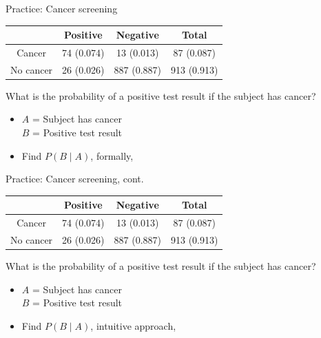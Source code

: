 \documentclass[xcolor=table, aspectratio=169, bigger]{beamer}
\begin{document}
\begin{frame}{Practice: Cancer screening}
\begin{block}{}
{\centering \renewcommand{\arraystretch}{1}
\begin{tabular}{c | c  c | c}
 & Positive & Negative & Total \\
\hline
Cancer & 74 (0.074) & 13 (0.013) & 87 (0.087)\\
No cancer & 26 (0.026) & 887 (0.887) & 913 (0.913)\\
\end{tabular}\par
\renewcommand{\arraystretch}{1.5}
}
\end{block}

\begin{exampleblock}{}
What is the probability of a positive test result if the subject has cancer?
\begin{itemize}
\pause
\item $A$ = Subject has cancer\\
$B$ = Positive test result
\pause
\item Find $P(B\mid A)$, formally, \\ \smallskip 
\pause
{}
\end{itemize}
\end{exampleblock}
\end{frame}

\begin{frame}{Practice: Cancer screening, cont.}
\begin{block}{}
{\centering \renewcommand{\arraystretch}{1}
\begin{tabular}{c | c  c | c}
 & Positive & Negative & Total \\
\hline
Cancer & 74 (0.074) & 13 (0.013) & 87 (0.087)\\
No cancer & 26 (0.026) & 887 (0.887) & 913 (0.913)\\
\end{tabular}\par
\renewcommand{\arraystretch}{1.5}
}
\end{block}

\begin{exampleblock}{}
What is the probability of a positive test result if the subject has cancer?
\begin{itemize}
\item $A$ = Subject has cancer\\
$B$ = Positive test result

\item Find $P(B\mid A)$, intuitive approach,\\ \smallskip
\pause
{}
\end{itemize}
\end{exampleblock}
\end{frame}
\end{document}
